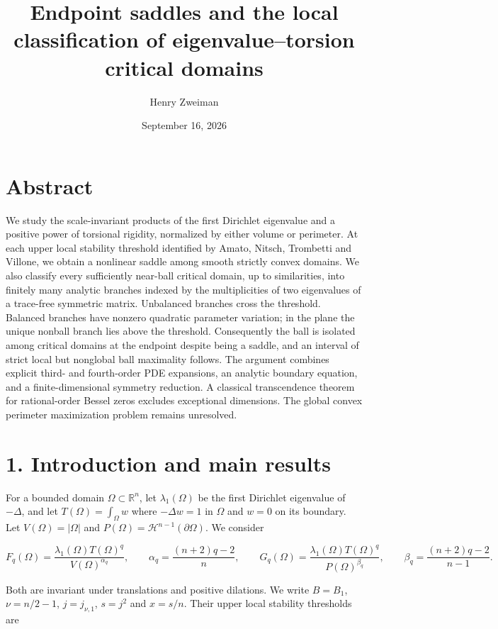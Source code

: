 \documentclass[11pt]{article}
\title{Endpoint saddles and the local classification of eigenvalue--torsion critical domains}
\author{Henry Zweiman}
\date{September 16, 2026}
\begin{document}
\maketitle
{}\section{Abstract}\label{abstract}

We study the scale-invariant products of the first Dirichlet eigenvalue
and a positive power of torsional rigidity, normalized by either volume
or perimeter. At each upper local stability threshold identified by
Amato, Nitsch, Trombetti and Villone, we obtain a nonlinear saddle among
smooth strictly convex domains. We also classify every sufficiently
near-ball critical domain, up to similarities, into finitely many
analytic branches indexed by the multiplicities of two eigenvalues of a
trace-free symmetric matrix. Unbalanced branches cross the threshold.
Balanced branches have nonzero quadratic parameter variation; in the
plane the unique nonball branch lies above the threshold. Consequently
the ball is isolated among critical domains at the endpoint despite
being a saddle, and an interval of strict local but nonglobal ball
maximality follows. The argument combines explicit third- and
fourth-order PDE expansions, an analytic boundary equation, and a
finite-dimensional symmetry reduction. A classical transcendence theorem
for rational-order Bessel zeros excludes exceptional dimensions. The
global convex perimeter maximization problem remains unresolved.

\section{1. Introduction and main
results}\label{introduction-and-main-results}

For a bounded domain \(\Omega\subset\mathbb R^n\), let
\(\lambda_1(\Omega)\) be the first Dirichlet eigenvalue of \(-\Delta\),
and let \(T(\Omega)=\int_\Omega w\) where \(-\Delta w=1\) in \(\Omega\)
and \(w=0\) on its boundary. Let \(V(\Omega)=|\Omega|\) and
\(P(\Omega)=\mathcal H^{n-1}(\partial\Omega)\). We consider

\[
F_q(\Omega)=\frac{\lambda_1(\Omega)T(\Omega)^q}{V(\Omega)^{\alpha_q}},
\qquad \alpha_q=\frac{(n+2)q-2}{n},
\qquad
G_q(\Omega)=\frac{\lambda_1(\Omega)T(\Omega)^q}{P(\Omega)^{\beta_q}},
\qquad \beta_q=\frac{(n+2)q-2}{n-1}.
\tag{1.1}
\]

Both are invariant under translations and positive dilations. We write
\(B=B_1\), \(\nu=n/2-1\), \(j=j_{\nu,1}\), \(s=j^2\) and \(x=s/n\).
Their upper local stability thresholds are
\end{document}
